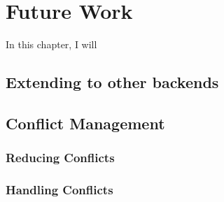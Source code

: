 \chapter{Future Work}

In this chapter, I will

\section{Extending to other backends}

\section{Conflict Management}




\subsection{Reducing Conflicts}

\subsection{Handling Conflicts}
